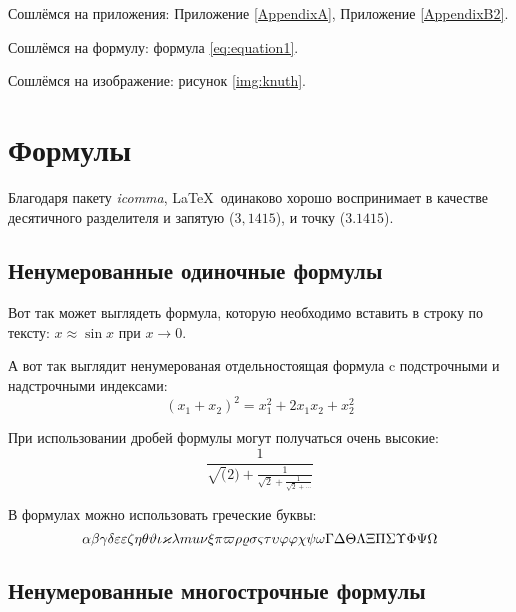 

Сошлёмся на приложения: Приложение \ref{AppendixA}, Приложение \ref{AppendixB2}.

Сошлёмся на формулу: формула \eqref{eq:equation1}.

Сошлёмся на изображение: рисунок \ref{img:knuth}.


\section{Формулы} \label{sect1_3}

Благодаря пакету \textit{icomma}, \LaTeX~одинаково хорошо воспринимает в качестве десятичного разделителя и запятую ($3,1415$), и точку ($3.1415$).

\subsection{Ненумерованные одиночные формулы} \label{subsect1_3_1}

Вот так может выглядеть формула, которую необходимо вставить в строку по тексту: $x \approx \sin x$ при $x \to 0$.

А вот так выглядит ненумерованая отдельностоящая формула c подстрочными и надстрочными индексами:
\[
(x_1+x_2)^2 = x_1^2 + 2 x_1 x_2 + x_2^2
\]

При использовании дробей формулы могут получаться очень высокие:
\[
  \frac{1}{\sqrt(2)+
  \displaystyle\frac{1}{\sqrt{2}+
  \displaystyle\frac{1}{\sqrt{2}+\cdots}}}
\]

В формулах можно использовать греческие буквы:
\[
\alpha\beta\gamma\delta\epsilon\varepsilon\zeta\eta\theta\vartheta\iota\kappa\lambda\\mu\nu\xi\pi\varpi\rho\varrho\sigma\varsigma\tau\upsilon\phi\varphi\chi\psi\omega\Gamma\Delta\Theta\Lambda\Xi\Pi\Sigma\Upsilon\Phi\Psi\Omega
\]


\subsection{Ненумерованные многострочные формулы} \label{subsect1_3_2}

